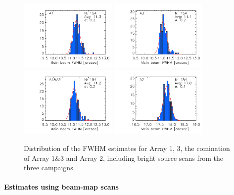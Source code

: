 \begin{figure}[ht!]
\begin{center}
  \includegraphics[clip, width=0.42\textwidth]{Figures/Beams/plot_histo_FWHM_mb_radius_binning2_a1.pdf}
  \includegraphics[clip, width=0.42\textwidth]{Figures/Beams/plot_histo_FWHM_mb_radius_binning2_a3.pdf}
  \includegraphics[clip, width=0.42\textwidth]{Figures/Beams/plot_histo_FWHM_mb_radius_binning2_1mm.pdf}
  \includegraphics[clip, width=0.42\textwidth]{Figures/Beams/plot_histo_FWHM_mb_radius_binning2_a2.pdf}
  \caption[Main Beam FWHM distributions]{Distribution of the FWHM estimates for Array 1, 3, the comination of Array $1\&3$ and Array 2, including bright source scans from the three campaigns.}
\label{fig:fwhm_map}
\end{center}
\end{figure}

\paragraph{Estimates using beam-map scans}

